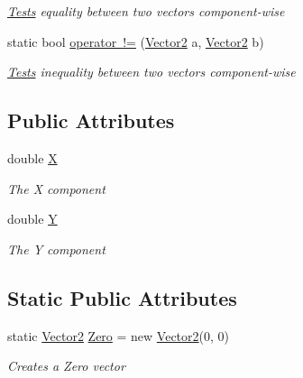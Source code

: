 \begin{DoxyCompactItemize}
\begin{DoxyCompactList}\small\item\em \mbox{\hyperlink{namespace_eagle_eye_1_1_tests}{Tests}} equality between two vectors component-\/wise \end{DoxyCompactList}\item 
static bool \mbox{\hyperlink{struct_eagle_eye_1_1_models_1_1_geometry_1_1_vector2_acd00f015d699aa6b3c1799e6a8ebe561}{operator !=}} (\mbox{\hyperlink{struct_eagle_eye_1_1_models_1_1_geometry_1_1_vector2}{Vector2}} a, \mbox{\hyperlink{struct_eagle_eye_1_1_models_1_1_geometry_1_1_vector2}{Vector2}} b)
\begin{DoxyCompactList}\small\item\em \mbox{\hyperlink{namespace_eagle_eye_1_1_tests}{Tests}} inequality between two vectors component-\/wise \end{DoxyCompactList}\end{DoxyCompactItemize}
\subsection*{Public Attributes}
\begin{DoxyCompactItemize}
\item 
double \mbox{\hyperlink{struct_eagle_eye_1_1_models_1_1_geometry_1_1_vector2_a2b3544fa189d93a2f390502febb12abb}{X}}
\begin{DoxyCompactList}\small\item\em The X component \end{DoxyCompactList}\item 
double \mbox{\hyperlink{struct_eagle_eye_1_1_models_1_1_geometry_1_1_vector2_ab8159c6235530a915d7d358605658f66}{Y}}
\begin{DoxyCompactList}\small\item\em The Y component \end{DoxyCompactList}\end{DoxyCompactItemize}
\subsection*{Static Public Attributes}
\begin{DoxyCompactItemize}
\item 
static \mbox{\hyperlink{struct_eagle_eye_1_1_models_1_1_geometry_1_1_vector2}{Vector2}} \mbox{\hyperlink{struct_eagle_eye_1_1_models_1_1_geometry_1_1_vector2_a2ea7f8dfe7ca54c5a1b964c4612e6e2a}{Zero}} = new \mbox{\hyperlink{struct_eagle_eye_1_1_models_1_1_geometry_1_1_vector2}{Vector2}}(0, 0)
\begin{DoxyCompactList}\small\item\em Creates a Zero vector \end{DoxyCompactList}\end{DoxyCompactItemize}
